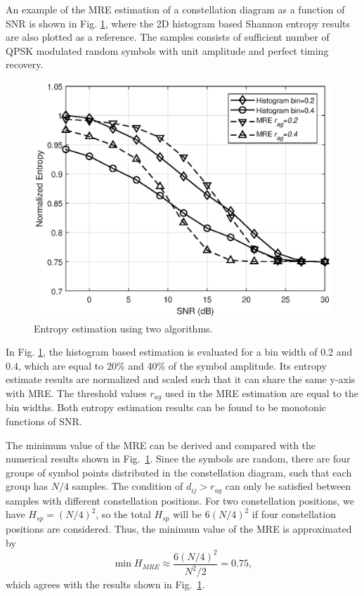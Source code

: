\documentclass[journal,comsoc]{IEEEtran}
\begin{document}

An example of the MRE estimation of a constellation diagram as a function of SNR is shown in Fig. \ref{fig:MRE}, where the 2D histogram based Shannon entropy results are also plotted as a reference.
The samples consists of sufficient number of  QPSK modulated random symbols with unit amplitude and perfect timing recovery.

\begin{figure}[ht]
\centering
\includegraphics[width=3 in]{pic/H_MR-k.eps}
\caption{Entropy estimation using two algorithms.}
\label{fig:MRE} 
\end{figure}

In Fig. \ref{fig:MRE}, the histogram based estimation is evaluated for a bin width of 0.2 and 0.4, which are equal to 20\% and 40\% of the symbol amplitude. 
Its entropy estimate results are normalized and scaled such that it can share the same y-axis with MRE.
The threshold values \(r_{ag}\) used in the MRE estimation are equal to the bin widths.
Both entropy estimation results can be found to be monotonic functions of SNR.

The minimum value of the MRE can be derived and compared with the numerical results shown in Fig.~\ref{fig:MRE}.
Since the symbols are random, there are four groups of symbol points distributed in the constellation diagram, such that each group has \(N/4\) samples.
The condition of $d_{ij}>r_{ag}$ can only be satisfied between samples with different constellation positions.
For two constellation positions, we have $H_{sp} = (N/4)^2$, so the total $H_{sp}$ will be $6 (N/4)^2$ if four constellation positions are considered.
Thus, the minimum value of the MRE is approximated by
\begin{equation}
\min{H_{MRE}} \approx \frac{ 6 \left(N/4\right)^2}{N^2/2}=0.75,
\label{eq:adEntQPSK}
\end{equation}
which agrees with the results shown in Fig.~\ref{fig:MRE}.
\end{document}
